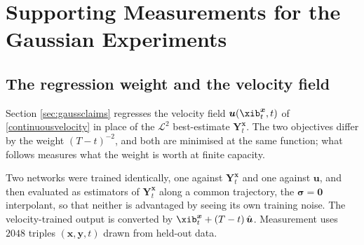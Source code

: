 
\section{Supporting Measurements for the Gaussian Experiments}
\label{app:experiments}

\subsection{The regression weight and the velocity field}
\label{app:weighting}

Section \ref{sec:gaussclaims} regresses the velocity field
$\boldsymbol{u}(\xib^{\boldsymbol{x}}_t,t)$ of \eqref{continuousvelocity} in place
of the $\mathcal{L}^2$ best-estimate $\boldsymbol{Y}^{\boldsymbol{x}}_t$. The two
objectives differ by the weight $(T-t)^{-2}$, and both are minimised at the same
function; what follows measures what the weight is worth at finite capacity.

Two networks were trained identically, one against
$\boldsymbol{Y}^{\boldsymbol{x}}_t$ and one against $\boldsymbol{u}$, and then
evaluated as estimators of $\boldsymbol{Y}^{\boldsymbol{x}}_t$ along a common
trajectory, the $\boldsymbol{\sigma}=\boldsymbol{0}$ interpolant, so that neither
is advantaged by seeing its own training noise. The velocity-trained output is
converted by $\xib^{\boldsymbol{x}}_t + (T-t)\,\hat{\boldsymbol{u}}$. Measurement
uses $2048$ triples $(\boldsymbol{x},\boldsymbol{y},t)$ drawn from held-out data.

